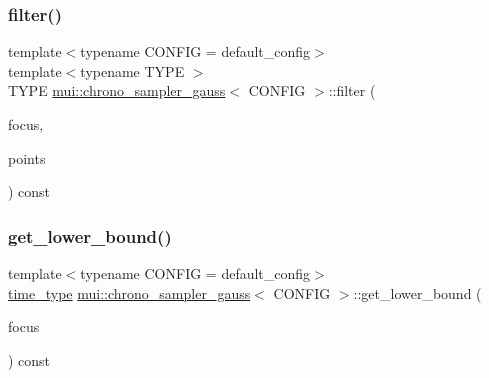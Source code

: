 \subsubsection{\texorpdfstring{filter()}{filter()}}
{\footnotesize\ttfamily template$<$typename C\+O\+N\+F\+IG  = default\+\_\+config$>$ \\
template$<$typename T\+Y\+PE $>$ \\
T\+Y\+PE \hyperlink{classmui_1_1chrono__sampler__gauss}{mui\+::chrono\+\_\+sampler\+\_\+gauss}$<$ C\+O\+N\+F\+IG $>$\+::filter (\begin{DoxyParamCaption}\item[{\hyperlink{classmui_1_1chrono__sampler__gauss_accb8778472734fd419da15b26e087a41}{time\+\_\+type}}]{focus,  }\item[{const std\+::vector$<$ std\+::pair$<$ \hyperlink{classmui_1_1chrono__sampler__gauss_accb8778472734fd419da15b26e087a41}{time\+\_\+type}, T\+Y\+PE $>$ $>$ \&}]{points }\end{DoxyParamCaption}) const\hspace{0.3cm}{\ttfamily [inline]}}

\mbox{\label{classmui_1_1chrono__sampler__gauss_aea11a50917c7bae0a75b9b4fafc31911}} 
\subsubsection{\texorpdfstring{get\+\_\+lower\+\_\+bound()}{get\_lower\_bound()}}
{\footnotesize\ttfamily template$<$typename C\+O\+N\+F\+IG  = default\+\_\+config$>$ \\
\hyperlink{classmui_1_1chrono__sampler__gauss_accb8778472734fd419da15b26e087a41}{time\+\_\+type} \hyperlink{classmui_1_1chrono__sampler__gauss}{mui\+::chrono\+\_\+sampler\+\_\+gauss}$<$ C\+O\+N\+F\+IG $>$\+::get\+\_\+lower\+\_\+bound (\begin{DoxyParamCaption}\item[{\hyperlink{classmui_1_1chrono__sampler__gauss_accb8778472734fd419da15b26e087a41}{time\+\_\+type}}]{focus }\end{DoxyParamCaption}) const\hspace{0.3cm}{\ttfamily [inline]}}

